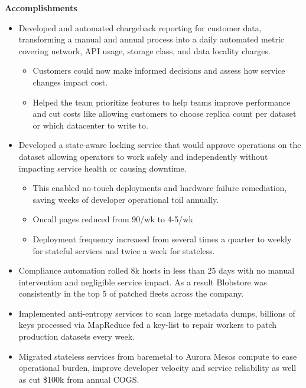 \begin{mdframed}[linewidth=2,linecolor=blue, innertopmargin=1em, innerbottommargin=1em, topline=false, rightline=false, bottomline=false]
    {\bf Accomplishments}
     \begin{itemize}
        \itemsep -5pt {} 
         \item Developed and automated chargeback reporting for customer data, transforming a manual and annual process into a daily automated metric covering network, API usage, storage class, and data locality charges. 
         \begin{itemize}
            \item Customers could now make informed decisions and assess how service changes impact cost.
            \item Helped the team prioritize features to help teams improve performance and cut costs like allowing customers to choose replica count per dataset or which datacenter to write to. 
         \end{itemize}
         \item Developed a state-aware locking service that would approve operations on the dataset allowing operators to work safely and independently without impacting service health or causing downtime. 
         \begin{itemize}
            \item This enabled no-touch deployments and hardware failure remediation, saving weeks of developer operational toil annually.
            \item Oncall pages reduced from 90/wk to 4-5/wk
            \item Deployment frequency increased from several times a quarter to weekly for stateful services and twice a week for stateless.
         \end{itemize}
         \item Compliance automation rolled 8k hosts in less than 25 days with no manual intervention and negligible service impact. As a result Blobstore was consistently in the top 5 of patched fleets across the company. 
         \item Implemented anti-entropy services to scan large metadata dumps, billions of keys processed via MapReduce fed a key-list to repair workers to patch production datasets every week. 
         \item Migrated stateless services from baremetal to Aurora Mesos compute to ease operational burden, improve developer velocity and service reliability as well as cut \$100k from annual COGS.
     \end{itemize}
    \end{mdframed}
